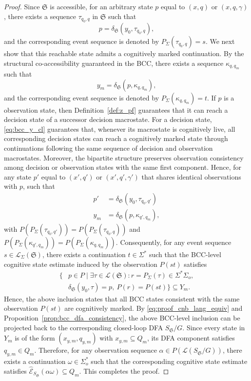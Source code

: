\documentclass[final,5p,times,twocolumn,authoryear]{elsarticle}
\begin{document}
\begin{proof}
Since $\mathfrak{S}$ is accessible, for an arbitrary state $p$ equal to $(x, q)$ or $(x, q, \gamma)$, there exists a sequence $\tau_{q_0, q}$ in $\mathfrak{S}$ such that
$$
p = \delta_{\mathfrak{S}}(y_0, \tau_{q_0, q}),
$$
%
and the corresponding event sequence is denoted by
$P_\Sigma(\tau_{q_0, q}) = s$.
%
We next show that this reachable state admits a cognitively marked continuation. 
By the structural co-accessibility guaranteed in the BCC, there exists a sequence $\kappa_{q, q_m}$ such that
$$
y_m = \delta_{\mathfrak{S}}(p, \kappa_{q, q_m}),
$$
and the corresponding event sequence is denoted by $P_\Sigma(\kappa_{q, q_m}) = t$.
%
If $p$ is a observation state, then Definition~\ref{def:z_pf} guarantees that it can reach a decision state of a successor decision macrostate.
%
For a decision state, \eqref{eq:bcc_y_cl} guarantees that, whenever its macrostate is cognitively live, all corresponding decision states can reach a cognitively marked state through continuations following the same sequence of decision and observation macrostates.
%
Moreover, the bipartite structure preserves observation consistency among decision or observation states with the same first component.
Hence, for any state $p'$ equal to $(x', q')$ or $(x', q', \gamma')$ that shares identical observations with $p$, such that
$$
\begin{aligned}
    p' &= \delta_{\mathfrak{S}}(y_0, \tau_{q_0, q'}) \\
    y_m &= \delta_{\mathfrak{S}}(p, \kappa_{q', q_m}),
\end{aligned}
$$
with
$
P(P_\Sigma(\tau_{q_0, q'})) = P(P_\Sigma(\tau_{q_0, q}))
$
and
$
P(P_\Sigma(\kappa_{q', q_m})) = P(P_\Sigma(\kappa_{q, q_m})).
$
Consequently, for any event sequence 
$s \in \mathcal{L}_{\Sigma}(\mathfrak{S})$, there exists a continuation 
$t \in \Sigma^*$ such that the BCC-level cognitive state estimate induced by the observation $P(st)$ satisfies
%
$$
\begin{aligned}
\{ &p \in P \mid 
\exists \tau \in \mathcal{L}(\mathfrak{S}) :  
r = P_{\Sigma}(\tau) \in \Sigma^*\Sigma_o, \\
& \delta_{\mathfrak{S}}(y_0, \tau) = p,\
P(r) = P(st) \}
\subseteq Y_m .
\end{aligned}
$$
%
Hence, the above inclusion states that all BCC states consistent with the same observation $P(st)$ are cognitively marked.
%
By \eqref{eq:proof_cnb_lang_equiv} and Proposition~\ref{prop:bcc_dfa_consistency}, the above BCC-level inclusion can be projected back to the corresponding closed-loop DFA $S_{\mathfrak{S}} / G$. Since every state in $Y_m$ is of the form $(x_{y,m}, q_{y,m})$ with $x_{y,m} \subseteq Q_m$, its DFA component satisfies $q_{y,m} \in Q_m$. 
Therefore, for any observation sequence $\alpha \in P(\mathcal{L}(S_{\mathfrak{S}}/G))$, there exists a continuation $\omega \in \Sigma_o^*$ such that the corresponding cognitive state estimate satisfies 
$
\hat{\mathcal{E}}_{S_{\mathfrak{S}}}(\alpha\omega) \subseteq Q_m .
$
This completes the proof.
\end{proof}
\end{document}
